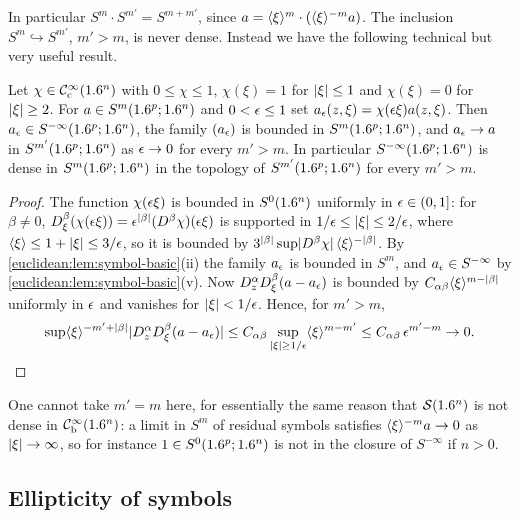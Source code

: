 In particular $S^m\cdot S^{m'}=S^{m+m'}$, since
$a=\langle \xi\rangle^{m}\cdot(\langle \xi\rangle^{-m}a)$. The inclusion
$S^m\hookrightarrow S^{m'}$, $m'>m$, is never dense. Instead we have the
following technical but very useful result.

\begin{lemma}\label{euclidean:lem:density}
  Let $\chi\in\mathcal{C}^\infty_{\mathrm{c}}(1.6^n)$ with $0\le\chi\le1$, $\chi(\xi)=1$ for
  $\lvert \xi\rvert\le1$ and $\chi(\xi)=0$ for $\lvert \xi\rvert\ge2$. For
  $a\in S^m(1.6^p;1.6^n)$ and $0<\epsilon\le1$ set
  $a_\epsilon(z,\xi)=\chi(\epsilon\xi)a(z,\xi)$. Then $a_\epsilon\in S^{-\infty}(1.6^p;1.6^n)$,
  the family $(a_\epsilon)$ is bounded in $S^m(1.6^p;1.6^n)$, and $a_\epsilon\to a$ in
  $S^{m'}(1.6^p;1.6^n)$ as $\epsilon\to0$ for every $m'>m$. In particular
  $S^{-\infty}(1.6^p;1.6^n)$ is dense in $S^m(1.6^p;1.6^n)$ in the topology of
  $S^{m'}(1.6^p;1.6^n)$ for every $m'>m$.
\end{lemma}
\begin{proof}
  The function $\chi(\epsilon\xi)$ is bounded in $S^0(1.6^n)$ uniformly in
  $\epsilon\in(0,1]$: for $\beta\ne0$,
  $D^\beta_\xi(\chi(\epsilon\xi))=\epsilon^{\lvert \beta\rvert}(D^\beta\chi)(\epsilon\xi)$ is
  supported in $1/\epsilon\le\lvert \xi\rvert\le2/\epsilon$, where
  $\langle \xi\rangle\le1+\lvert \xi\rvert\le3/\epsilon$, so it is bounded by
  $3^{\lvert \beta\rvert}\sup\lvert D^\beta\chi\rvert\,\langle \xi\rangle^{-\lvert \beta\rvert}$. By
  \cref{euclidean:lem:symbol-basic}(ii) the family $a_\epsilon$ is bounded in
  $S^m$, and $a_\epsilon\in S^{-\infty}$ by \cref{euclidean:lem:symbol-basic}(v).
  Now $D^\alpha_zD^\beta_\xi(a-a_\epsilon)$ is bounded by
  $C_{\alpha\beta}\langle \xi\rangle^{m-\lvert \beta\rvert}$ uniformly in $\epsilon$ and vanishes for
  $\lvert \xi\rvert<1/\epsilon$. Hence, for $m'>m$,
  \begin{equation*}
    \sup\langle \xi\rangle^{-m'+\lvert \beta\rvert}\lvert D^\alpha_zD^\beta_\xi(a-a_\epsilon)\rvert
    \le C_{\alpha\beta}\sup_{\lvert \xi\rvert\ge1/\epsilon}\langle \xi\rangle^{m-m'}
    \le C_{\alpha\beta}\,\epsilon^{m'-m}\to0.\qedhere
  \end{equation*}
\end{proof}

One cannot take $m'=m$ here, for essentially the same reason that $\mathcal{S}(1.6^n)$
is not dense in $\mathcal{C}^\infty_{\mathrm{b}}(1.6^n)$: a limit in $S^m$ of residual symbols satisfies
$\langle \xi\rangle^{-m}a\to0$ as $\lvert \xi\rvert\to\infty$, so for instance
$1\in S^0(1.6^p;1.6^n)$ is not in the closure of $S^{-\infty}$ if $n>0$.

\subsection{Ellipticity of symbols}

